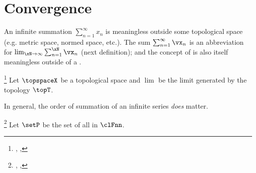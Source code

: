 \section{Convergence}
\label{sec:series_convergence}
An infinite summation $\sum_{n=1}^\infty x_n$ is meaningless outside some 
topological space (e.g. metric space, normed space, etc.).
The sum $\sum_{n=1}^\infty \vx_n$ is an abbreviation for $\lim_{\xN\to\infty}\sum_{n=1}^\xN \vx_n$
(next definition); and the concept of  is also itself meaningless outside of a 
.
\begin{definition}
\footnote{
  ,
  ,
  }
\label{def:suminf}
Let $\topspaceX$ be a topological space and $\lim$ be the limit generated by the topology $\topT$.
\end{definition}

In general, the order of summation of an infinite series \emph{does} matter.

\begin{definition}
\footnote{
  ,
  , %
  }
\label{def:abscon}
Let $\setP$ be the set of all  in $\clFnn$.
\end{definition}

